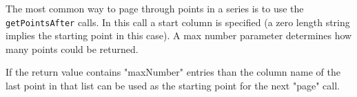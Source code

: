 The most common way to page through points in a series is to use the \verb+getPointsAfter+ calls. In this call
a start column is specified (a zero length string implies the starting point in this case). A max number parameter
determines how many points could be returned.

If the return value contains "maxNumber" entries than the column name of the last point in that list can be
used as the starting point for the next "page" call.
